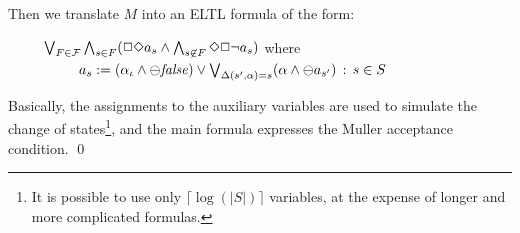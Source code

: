 \documentclass{llncs}
\begin{document}

\noindent
Then we translate $M$ into an ELTL formula
of the form: 

\begin{tabbing}
\ \ \ \ \ $\bigvee_{F \in {\cal F}} \bigwedge_{s \in F} ( \Box\Diamond a_s \wedge \bigwedge_{s \not\in F} \Diamond \Box \neg a_s)$
where \\
\ \ \ \ \ \ \ \ \ \ $a_s :=   ( \alpha_{\iota} \wedge \ominus \mathit{false} ) \vee \bigvee_{\Delta ( s'
, \alpha ) = s } 
(\alpha \wedge \ominus a_{s'}) 
\, :\,  s \in S$
\end{tabbing}

\noindent
Basically, the assignments to the auxiliary variables are used to simulate the change of states\footnote{It is possible to use only $\lceil \log ( | S | ) \rceil$
variables, at the expense of longer and more complicated formulas.}, and the main formula expresses the Muller acceptance condition. \qed
\end{document}
